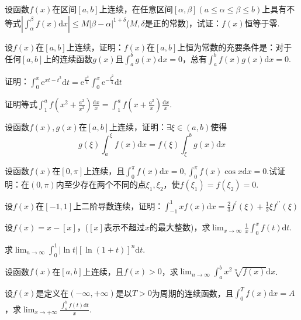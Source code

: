 \begin{xiti}
\item 设函数$f(x)$在区间$[a,b]$上连续，在任意区间$[ \alpha , \beta ] ( a \leqslant \alpha \leqslant \beta \leqslant b )$上具有不等式$\left| \int _ { \alpha } ^ { \beta } f ( x ) \mathrm { d } x \right| \leqslant M | \beta - \alpha | ^ { 1 + \delta }$($M,\delta$是正的常数)，试证：$f(x)$恒等于零.
\item 设$f(x)$在$[a,b]$上连续，证明：$f(x)$在$[a,b]$上恒为常数的充要条件是：对于任何$[a,b]$上的连续函数$g(x)$且$\int _ { a } ^ { b } g ( x ) \mathrm { d } x = 0$，总有$\int _ { a } ^ { b } f ( x ) g ( x ) \mathrm { d } x = 0$.
\item 证明：$\int _ { 0 } ^ { x } \mathrm { e } ^ { x t - t ^ { 2 } } \mathrm { d } t = \mathrm { e } ^ { \frac { x ^ { 2 } } { 4 } } \int _ { 0 } ^ { x } \mathrm { e } ^ { - \frac { t ^ { 2 } } { 4 } } \mathrm { d } t$
\item 证明等式$\int _ { 1 } ^ { a } f \left( x ^ { 2 } + \frac { a ^ { 2 } } { x ^ { 2 } } \right) \frac { \mathrm { d } x } { x } = \int _ { 1 } ^ { a } f \left( x + \frac { a ^ { 2 } } { x } \right) \frac { \mathrm { d } x } { x }$.
\item 设函数$f(x),g(x)$在$[a,b]$上连续，证明：$\exists \xi \in (a,b)$使得
\[g ( \xi ) \int _ { a } ^ { \xi } f ( x ) \mathrm { d } x = f ( \xi ) \int _ { \xi } ^ { b } g ( x ) \mathrm { d } x\]
\item 设函数$f(x)$在$[0,\pi ]$上连续，且$\int _ { 0 } ^ { \pi } f ( x ) \mathrm { d } x = 0 , \int _ { 0 } ^ { \pi } f ( x ) \cos x \mathrm { d } x = 0$.试证明：在$(0,\pi )$内至少存在两个不同的点$\xi_{ 1 },\xi_{ 2 }$，使$f(\xi_{ 1 })=f(\xi_{ 2 })=0$.
\item 设$f(x)$在$[-1,1]$上二阶导数连续，证明：$\int _ { - 1 } ^ { 1 } x f ( x ) \mathrm { d } x = \frac { 2 } { 3 } f ^ { \prime } ( \xi ) + \frac { 1 } { 3 } \xi f ^ { \prime \prime } ( \xi )$
\item 设$f(x)=x-[x]$，($[x]$表示不超过$x$的最大整数)，求$\lim _ { x \rightarrow \infty } \frac { 1 } { x } \int _ { 0 } ^ { x } f ( t ) \mathrm { d } t$.
\item 求$\lim _ { n \rightarrow \infty } \int _ { 0 } ^ { 1 } | \ln t | [ \ln ( 1 + t ) ] ^ { n } \mathrm { d } t$.
\item 设函数$f(x)$在$[a,b]$上连续，且$f(x)>0$，求$\lim _ { n \rightarrow \infty } \int _ { a } ^ { b } x ^ { 2 } \sqrt [ n ] { f ( x ) } \mathrm { d } x$.
\item 设$f(x)$是定义在$(-\infty,+\infty)$是以$T>0$为周期的连续函数，且$\int_{0}^{T} f(x) \mathrm{d} x=A$，求$\lim _{x \rightarrow+\infty} \frac{\int_{a}^{b} f(t) \mathrm{d} t}{x}$.

\end{xiti}
